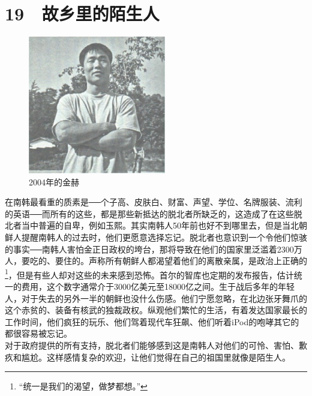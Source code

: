 \fancyhead[RO]{{\tiny{\textcolor{Gray}{\FA \ }}}\thepage}
\fancyhead[LE]{{\tiny{\textcolor{Gray}{\FA \ }}}\thepage}
\fancyfoot[LE,RO]{}
\fancyfoot[LO,CE]{}
\fancyfoot[CO,RE]{}
\chapter*{19 {\FA } 故乡里的陌生人}
\begin{figure}[!htbp]
\centering
\includegraphics[width=6cm]{./Chapters/Images/19.jpg}
\caption*{2004年的金赫}
\end{figure}


在南韩最看重的质素是──个子高、皮肤白、财富、声望、学位、名牌服装、流利的英语──而所有的这些，都是那些新抵达的脱北者所缺乏的，这造成了在这些脱北者当中普遍的自卑，例如玉熙。其实南韩人50年前也好不到哪里去，但是当北朝鲜人提醒南韩人的过去时，他们更愿意选择忘记。脱北者也意识到一个令他们惊骇的事实──南韩人害怕金正日政权的垮台，那将导致在他们的国家里泛滥着2300万人，要吃的、要住的。声称所有朝鲜人都渴望着他们的离散亲属，是政治上正确的\footnote{“统一是我们的渴望，做梦都想。”}，但是有些人却对这些的未来感到恐怖。首尔的智库也定期的发布报告，估计统一的费用，这个数字通常介于3000亿美元至18000亿之间。生于战后多年的年轻人，对于失去的另外一半的朝鲜也没什么伤感。他们宁愿忽略，在北边张牙舞爪的这个赤贫的、装备有核武的独裁政权。纵观他们繁忙的生活，有着发达国家最长的工作时间，他们疯狂的玩乐、他们驾着现代车狂飙、他们听着iPod的咆哮其它的都很容易被忘记。\\

对于政府提供的所有支持，脱北者们能够感到这是南韩人对他们的可怜、害怕、歉疚和尴尬。这样感情复杂的欢迎，让他们觉得在自己的祖国里就像是陌生人。\\

